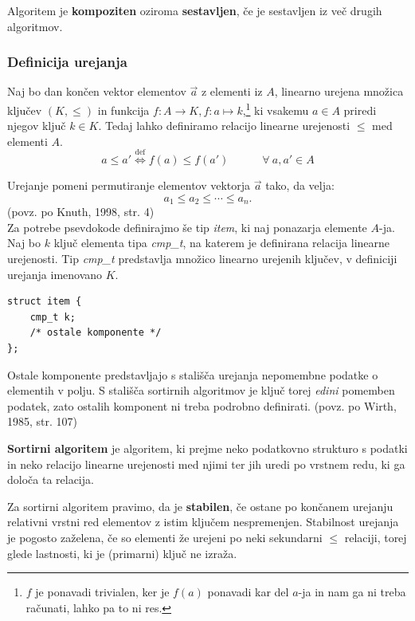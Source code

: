 \documentclass[a4paper,oneside,12pt]{article}
\begin{document}
\begin{definicija}
  Algoritem je \textbf{kompoziten} oziroma \textbf{sestavljen}, če je sestavljen iz več
  drugih algoritmov.
\end{definicija}

\subsubsection{Definicija urejanja}
\label{chapter:sortdef}
Naj bo dan končen vektor elementov $\vec{a}$ z elementi iz $A$, linearno urejena množica ključev $(K,
\leq)$ in funkcija $f\!\!: A \rightarrow K, f\!\!: a \mapsto k$,\footnote{
$f$ je ponavadi trivialen, ker je $f(a)$ ponavadi kar del
$a$-ja in nam ga ni treba računati, lahko pa to ni res.} ki vsakemu $a \in A$ priredi
njegov ključ $k \in K$.
Tedaj lahko definiramo relacijo linearne urejenosti $\leq$ med elementi $A$.
\[ a \leq a' \overset{\text{def}}{\Longleftrightarrow} f(a) \leq f(a') \hspace{3em} \forall\ a, a' \in A \]

Urejanje pomeni permutiranje elementov vektorja $\vec{a}$ tako, da velja:
\[ a_1 \leq a_2 \leq \cdots \leq a_n.\]
(povz. po Knuth, 1998, str. 4) \\

Za potrebe psevdokode definirajmo še tip \emph{item}, ki naj ponazarja elemente
\mbox{$A$-ja}.
Naj bo $k$ ključ elementa tipa \emph{cmp\_\!t}, na katerem je definirana relacija
linearne urejenosti. Tip \emph{cmp\_\!t} predstavlja množico linearno urejenih ključev,
v definiciji urejanja imenovano $K$.

\begin{lstlisting}
struct item {
    cmp_t k;
    /* ostale komponente */
};
\end{lstlisting}

Ostale komponente predstavljajo s stališča urejanja nepomembne podatke o elementih v
polju.
S stališča sortirnih algoritmov je ključ torej \emph{edini} pomemben podatek, zato
ostalih komponent ni treba podrobno definirati.
(povz. po Wirth, 1985, str. 107)

\begin{definicija}
  \textbf{Sortirni algoritem} je algoritem, ki prejme neko podatkovno strukturo s podatki
  in neko relacijo linearne urejenosti med njimi ter jih uredi po vrstnem redu, ki ga določa ta
  relacija.
\end{definicija}

\begin{definicija}
  Za sortirni algoritem pravimo, da je \textbf{stabilen}, če ostane po končanem urejanju
  relativni vrstni red elementov z istim ključem nespremenjen.
  Stabilnost urejanja je pogosto zaželena, če so elementi že urejeni po neki
  sekundarni $\leq$ relaciji, torej glede lastnosti, ki je (primarni) ključ ne izraža.
\end{definicija}
\end{document}

